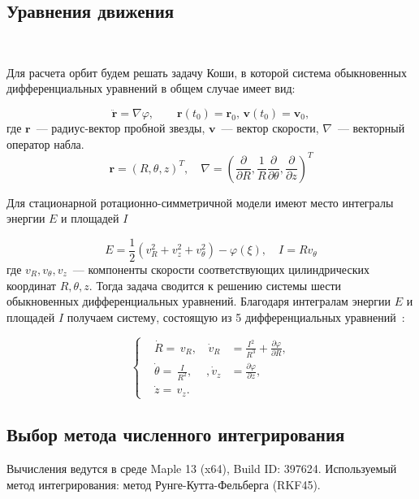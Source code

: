 \subsection{Уравнения движения}
~\par
Для расчета орбит будем решать задачу Коши, в которой система обыкновенных дифференциальных уравнений в общем случае имеет вид:

\begin{equation}\label{zK}
\ddot{\textbf{r}} = \nabla \varphi, \qquad \textbf{r}(t_0)=\textbf{r}_0,\, \textbf{v}(t_0)=\textbf{v}_0,
\end{equation}
где $\textbf{r}$~--- радиус-вектор пробной звезды, $\textbf{v}$~--- вектор скорости, $\nabla$~--- векторный оператор набла.
$$
\textbf{r} = (R, \theta, z)^T, \quad
\nabla = \left( \frac{\partial}{\partial R}, \frac{1}{R}\frac{\partial}{\partial \theta}, \frac{\partial}{\partial z} \right)^T
$$

Для стационарной ротационно-симметричной модели имеют место интегралы энергии $ E $ и площадей $ I $~\cite{ogor}

\begin{equation}\label{EI}
E = \frac{1}{2}(v_R^2 + v_z^2 + v_{\theta}^2) - \varphi(\xi) , \quad
I = R v_{\theta}
\end{equation}
где $v_R, v_{\theta}, v_z$~--- компоненты скорости соответствующих цилиндрических координат $R, \theta, z$.
Тогда задача сводится к решению системы шести обыкновенных дифференциальных уравнений. Благодаря интегралам энергии $E$ и площадей $I$ получаем систему, состоящую из 5 дифференциальных уравнений~\cite{KutuzovOssipkov}:

\begin{equation}\label{systRz}
\left\{ \begin{aligned}
&\dot R = \, v_R, & \, \dot v_R & = \frac{I^2}{R^3} + \frac{\partial \varphi }{\partial R },\\
&\dot \theta = \, \frac I{R^2}, & , \dot v_z & = \frac{\partial \varphi}{\partial z },\\
&\dot z = \, v_z. &
\end{aligned}
\right.
\end{equation} 

\subsection{Выбор метода численного интегрирования}

Вычисления ведутся в среде {\ttfamily Maple 13 (x64)}, {\ttfamily Build ID: 397624}. Используемый метод интегрирования: метод Рунге-Кутта-Фельберга (RKF45).\\

